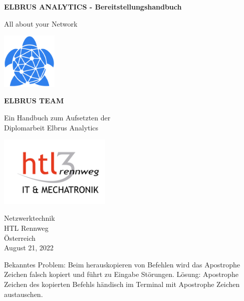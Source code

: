 \documentclass{article}
\begin{document}
	\begin{titlepage}
		\begin{center}
			\vspace*{1cm}
			
			\textbf{ELBRUS ANALYTICS - Bereitstellungshandbuch}
			
			\vspace{0.5cm}
			All about your Network
			
			\vspace{0.4cm}
			
			\includegraphics[width=0.2\textwidth]{logo.png}
			
			\vspace{0.6cm}
			\textbf{ELBRUS TEAM}
			
			\vfill
			
			Ein Handbuch zum Aufsetzten der \\
			Diplomarbeit Elbrus Analytics
			
			\vspace{0.8cm}
			
			\includegraphics[width=0.4\textwidth]{htl.png}
			
			Netzwerktechnik\\
			HTL Rennweg\\
			Österreich \\
			August 21, 2022
			
		\end{center}
	\end{titlepage}
	\newpage
	Bekanntes Problem: Beim herauskopieren von Befehlen wird das Apostrophe Zeichen falsch kopiert und führt zu Eingabe Störungen. Lösung: Apostrophe Zeichen des kopierten Befehls händisch im Terminal mit Apostrophe Zeichen austauschen. 
	
\end{document}
